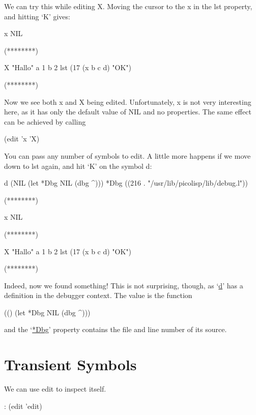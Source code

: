 We can try this while editing X. Moving the cursor to the x in the lst
property, and hitting `K' gives:


\begin{wideverbatim}
x NIL

(********)

X "Hallo"
   a 1
   b 2
   lst (17 (x b c d) "OK")

(********)
\end{wideverbatim}

Now we see both x and X being edited. Unfortunately, x is not very
interesting here, as it has only the default value of NIL and no
properties.
 The same effect can be achieved by calling


\begin{wideverbatim}
(edit 'x 'X)
\end{wideverbatim}

You can pass any number of symbols to edit.
 A little more happens if we move down to lst again, and hit `K' on the
symbol d:


\begin{wideverbatim}
d (NIL (let *Dbg NIL (dbg ^)))
   *Dbg ((216 . "/usr/lib/picolisp/lib/debug.l"))

(********)

x NIL

(********)

X "Hallo"
   a 1
   b 2
   lst (17 (x b c d) "OK")

(********)
\end{wideverbatim}

Indeed, now we found something! This is not surprising, though, as
`\href{http://software-lab.de/doc/refD.html#d}{d}' has a definition in the
debugger context. The value is the function


\begin{wideverbatim}
(() (let *Dbg NIL (dbg ^)))
\end{wideverbatim}

and the `\href{http://software-lab.de/doc/refD.html#*Dbg}{*Dbg}' property
contains the file and line number of its source.

\section{Transient Symbols}
\label{sec:edit-transient-symbols}


We can use edit to inspect itself.


\begin{wideverbatim}
: (edit 'edit)
\end{wideverbatim}

